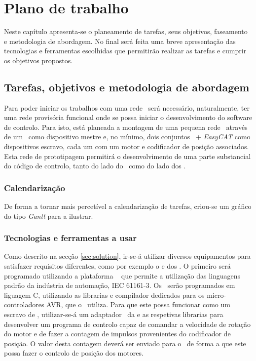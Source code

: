 \chapter{Plano de trabalho}\label{chap:chap3}

Neste capítulo apresenta-se o planeamento de tarefas, seus objetivos,
faseamento e metodologia de abordagem. No final será feita uma breve
apresentação das tecnologias e ferramentas escolhidas que permitirão
realizar as tarefas e cumprir os objetivos propostos.


\section{Tarefas, objetivos e metodologia de abordagem}

Para poder iniciar os trabalhos com uma rede \ecat\, será necessário,
naturalmente, ter uma rede provisória funcional onde se possa iniciar o
desenvolvimento do software de controlo. Para isto, está planeada a
montagem de uma pequena rede \ecat\ através de um \raspi\ como dispositivo
mestre e, no mínimo, dois conjuntos \arduino\ + \emph{EasyCAT} como
dispositivos escravo, cada um com um motor e codificador de posição
associados. Esta rede de prototipagem permitirá o desenvolvimento de uma
parte substancial do código de controlo, tanto do lado do \raspi\ como
do lado dos \arduino.

\subsection{Calendarização}
De forma a tornar mais percetível a calendarização de tarefas, criou-se
um gráfico do tipo \emph{Gantt} para a ilustrar.


\subsection{Tecnologias e ferramentas a usar}
Como descrito na secção \ref{sec:solution}, ir-se-á utilizar diversos
equipamentos para satisfazer requisitos diferentes, como por exemplo o
\raspi \cite[]{foundation:RaspberryPi} e dos \arduino. O primeiro será programado utilizando a plataforma 
\codesys\ \cite[]{CODESYS:codesys} que permite a utilização das linguagens
padrão da indústria de automação, IEC 61161-3. Os \arduino\ serão programados
em liguagem C, utilizando as librarias e compilador dedicados para os
micro-controladores AVR, que o \arduino\ utiliza. Para que este possa
funcionar como um escravo de \ecat, utilizar-se-á um adaptador \easycat\
da \cite{ABT:EasyCAT} e as respetivas librarias para desenvolver um
programa de controlo capaz de comandar a velocidade de rotação do motor
e de fazer a contagem de impulsos provenientes do codificador de posição.
O valor desta contagem deverá ser enviado para o \raspi\ de forma a que
este possa fazer o controlo de posição dos motores.

